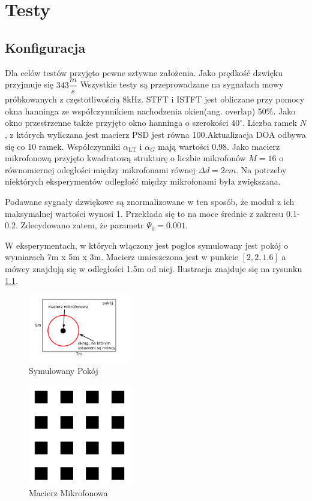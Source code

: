 \chapter{Testy}
\label{chapter-5}
\section{Konfiguracja}
Dla celów testów przyjęto pewne sztywne założenia. Jako prędkość dzwięku przyjmuje się $343 \dfrac{m}{s}$ Wszystkie testy są przeprowadzane na sygnałach mowy próbkowanych z częstotliwością 8kHz. STFT i ISTFT jest obliczane przy pomocy okna hanninga \cite{hann} ze współczynnikiem nachodzenia okien(ang. overlap) 50$\%$. Jako okno przestrzenne także przyjęto okno hanninga o szerokości $40^{\circ}$. Liczba ramek $N$, z których wyliczana jest macierz PSD jest równa 100.Aktualizacja DOA odbywa się co 10 ramek. Współczynniki $\alpha_{\mathrm{LT}}$ i $\alpha_{G}$ mają wartości 0.98. Jako macierz mikrofonową przyjęto kwadratową strukturę o liczbie mikrofonów $M=16$ o równomiernej odegłości między mikrofonami równej $\Delta d = 2cm$. Na potrzeby niektórych eksperymentów odległość między mikrofonami była zwiększana.

\noindent Podawane sygnały dzwiękowe są znormalizowane w ten sposób, że moduł z ich maksymalnej wartości wynosi 1. Przekłada się to na moce średnie z zakresu 0.1-0.2. Zdecydowano zatem, że parametr $\Psi_{0} = 0.001$. 

\noindent W eksperymentach, w których włączony jest pogłos symulowany jest pokój o wymiarach 7m x 5m x 3m. Macierz umieszczona jest w punkcie $[2,2,1.6]$ a mówcy znajdują się w odległości 1.5m od niej. Ilustracja znajduje się na rysunku \ref{fig:room}.

\begin{figure}[h!]
    \centering
    \includegraphics[width=0.4\textwidth]{Images/room.png}
    \caption{Symulowany Pokój}
    \label{fig:room}
\end{figure}

\begin{figure}[h!]
    \centering
    \includegraphics[width=0.4\textwidth]{Images/microphone.png}
    \caption{Macierz Mikrofonowa}
    \label{fig:microphone}
\end{figure}

